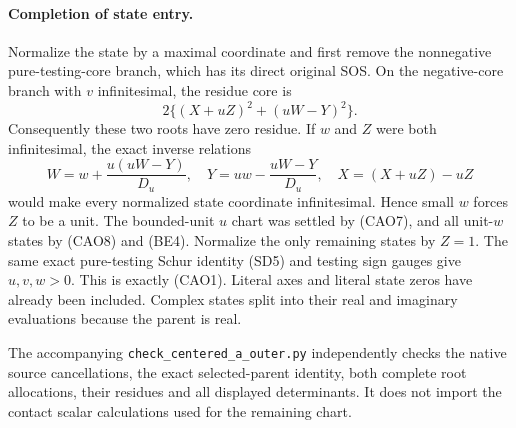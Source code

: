 \paragraph{Completion of state entry.}
Normalize the state by a maximal coordinate and first remove the
nonnegative pure-testing-core branch, which has its direct original
SOS. On the negative-core branch with $v$ infinitesimal, the residue
core is
\[
 2\{(X+uZ)^2+(uW-Y)^2\}.
\]
Consequently these two roots have zero residue. If $w$ and $Z$ were
both infinitesimal, the exact inverse relations
\[
 W=w+\frac{u(uW-Y)}{D_u},\quad
 Y=uw-\frac{uW-Y}{D_u},\quad X=(X+uZ)-uZ
\]
would make every normalized state coordinate infinitesimal. Hence
small $w$ forces $Z$ to be a unit. The bounded-unit $u$ chart was
settled by (CAO7), and all unit-$w$ states by (CAO8) and (BE4).
Normalize the only remaining states by $Z=1$. The same exact
pure-testing Schur identity (SD5) and testing sign gauges give
$u,v,w>0$. This is exactly (CAO1). Literal axes and literal state
zeros have already been included. Complex states split into their
real and imaginary evaluations because the parent is real.

The accompanying \texttt{check\_centered\_a\_outer.py} independently
checks the native source cancellations, the exact selected-parent
identity, both complete root allocations, their residues and all
displayed determinants. It does not import the contact scalar
calculations used for the remaining chart.
